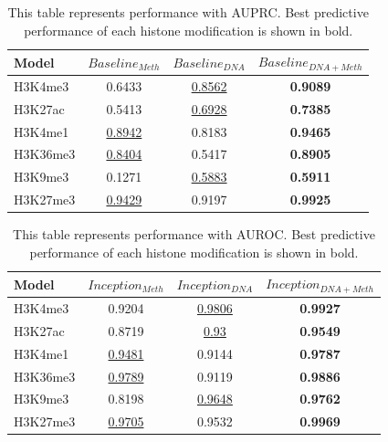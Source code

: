 \begin{table}[H]%
    \centering
    \begin{tabular}{lccc}
    \hline
    Model & $Baseline_{Meth}$ & $Baseline_{DNA}$ & $Baseline_{DNA+Meth}$ \\\hline
    H3K4me3 & 0.6433 & \underline{0.8562} & \textbf{0.9089} \\
    H3K27ac & 0.5413 & \underline{0.6928} & \textbf{0.7385} \\
    H3K4me1 & \underline{0.8942} & 0.8183 & \textbf{0.9465} \\
    H3K36me3 & \underline{0.8404} & 0.5417 & \textbf{0.8905} \\
    H3K9me3 & 0.1271 & \underline{0.5883} & \textbf{0.5911} \\
    H3K27me3 & \underline{0.9429} & 0.9197 & \textbf{0.9925} \\\hline
    \end{tabular}
    \captionsetup{labelfont=bf}
    \renewcommand{\baselinestretch}{1.0}
    \caption[Comparison of different inputs of baseline with AUPRC]{This table represents performance with AUPRC. Best predictive performance of each histone modification is shown in bold.}
    \label{t7}
\end{table}

\begin{table}[H]%
    \centering
    \begin{tabular}{lccc}
    \hline
    Model & $Inception_{Meth}$ & $Inception_{DNA}$ & $Inception_{DNA+Meth}$ \\\hline
    H3K4me3 & 0.9204 & \underline{0.9806} & \textbf{0.9927} \\
    H3K27ac & 0.8719 & \underline{0.93} & \textbf{0.9549} \\
    H3K4me1 & \underline{0.9481} & 0.9144 & \textbf{0.9787} \\
    H3K36me3 & \underline{0.9789} & 0.9119 & \textbf{0.9886} \\
    H3K9me3 & 0.8198 & \underline{0.9648} & \textbf{0.9762} \\
    H3K27me3 & \underline{0.9705} & 0.9532 & \textbf{0.9969} \\\hline
    \end{tabular}
    \captionsetup{labelfont=bf}
    \renewcommand{\baselinestretch}{1.0}
    \caption[Comparison of different inputs of inception with AUROC]{This table represents performance with AUROC. Best predictive performance of each histone modification is shown in bold.}
    \label{t8}
\end{table}

